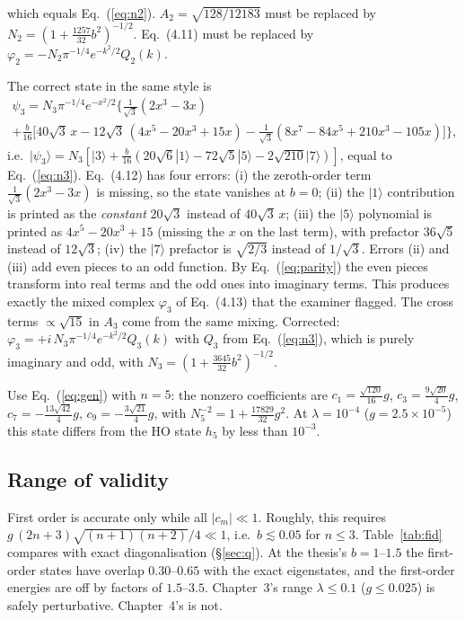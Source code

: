 \documentclass[11pt,a4paper]{article}
\newcommand{\Eq}[1]{Eq.~(#1)}
\newcommand{\ket}[1]{|#1\rangle}
\begin{document}
\begin{description}[leftmargin=1.2em,style=nextline]
\begin{multline}
  \end{multline}
  which equals \Eq{\ref{eq:n2}}. $A_2=\sqrt{128/12183}$ must be replaced by
  $N_2=(1+\tfrac{1257}{32}b^2)^{-1/2}$. \Eq{4.11} must be replaced by $\varphi_2=-N_2\pi^{-1/4}e^{-k^2/2}Q_2(k)$.
\item[Eqs.~(4.12)--(4.13) (point 6)] The correct state in the same style is
  \begin{multline}
  \psi_3=N_3\pi^{-1/4}e^{-x^2/2}\Big\{\tfrac1{\sqrt3}(2x^3-3x)\\
  +\tfrac b{16}\Big[40\sqrt3\,x-12\sqrt3\,(4x^5-20x^3+15x)
  -\tfrac{1}{\sqrt3}(8x^7-84x^5+210x^3-105x)\Big]\Big\},
  \label{eq:n3thesis}
  \end{multline}
  i.e.\ $\ket{\psi_3}=N_3[\ket3+\tfrac b{16}(20\sqrt6\ket1-72\sqrt5\ket5-2\sqrt{210}\ket7)]$, equal
  to \Eq{\ref{eq:n3}}. \Eq{4.12} has four errors:
  (i) the zeroth-order term $\tfrac{1}{\sqrt3}(2x^3-3x)$ is missing, so the state vanishes at $b=0$;
  (ii) the $\ket1$ contribution is printed as the \emph{constant} $20\sqrt3$ instead of $40\sqrt3\,x$;
  (iii) the $\ket5$ polynomial is printed as $4x^5-20x^3+15$ (missing the $x$ on the last
  term), with prefactor $36\sqrt5$ instead of $12\sqrt3$;
  (iv) the $\ket7$ prefactor is $\sqrt{2/3}$ instead of $1/\sqrt3$.
  Errors (ii) and (iii) add even pieces to an odd function. By \Eq{\ref{eq:parity}} the even
  pieces transform into real terms and the odd ones into imaginary terms. This produces
  exactly the mixed complex $\varphi_3$ of \Eq{4.13} that the examiner flagged. The cross
  terms $\propto\sqrt{15}$ in $A_3$ come from the same mixing. Corrected:
  $\varphi_3=+i\,N_3\pi^{-1/4}e^{-k^2/2}Q_3(k)$ with $Q_3$ from \Eq{\ref{eq:n3}}, which is purely
  imaginary and odd, with $N_3=(1+\tfrac{3645}{32}b^2)^{-1/2}$.
\item[$n=5$ (Ch.~3)] Use \Eq{\ref{eq:gen}} with $n=5$:
  the nonzero coefficients are $c_1=\tfrac{\sqrt{120}}{16}g$, $c_3=\tfrac{9\sqrt{20}}{4}g$,
  $c_7=-\tfrac{13\sqrt{42}}{4}g$, $c_9=-\tfrac{3\sqrt{21}}{4}g$, with $N_5^{-2}=1+\tfrac{17829}{32}g^2$.
  At $\lambda=10^{-4}$ ($g=2.5\times10^{-5}$) this state differs from the HO state $h_5$ by
  less than $10^{-3}$.
\end{description}

\subsection{Range of validity}
First order is accurate only while all $|c_m|\ll1$. Roughly, this requires
$g\,(2n+3)\sqrt{(n+1)(n+2)}/4\ll1$, i.e.\ $b\lesssim0.05$ for $n\le3$. Table~\ref{tab:fid}
compares with exact diagonalisation (\S\ref{sec:q}). At the thesis's $b=1$--$1.5$ the
first-order states have overlap $0.30$--$0.65$ with the exact eigenstates, and the
first-order energies are off by factors of $1.5$--$3.5$. Chapter~3's range
$\lambda\le0.1$ ($g\le0.025$) is safely perturbative. Chapter~4's is not.
\end{document}
